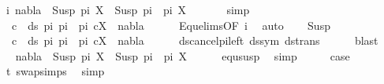 \begin{isabellebody}
\ i{\isacharcolon}{\kern0pt}\ {\isachardoublequoteopen}nabla\ {\isasymturnstile}\ Susp\ pi\ X\ {\isasymapprox}\ Susp\ {\isacharparenleft}{\kern0pt}pi{}\ {\isacharat}{\kern0pt}\ pi{\isacharprime}{\kern0pt}{\isacharparenright}{\kern0pt}\ X{\isachardoublequoteclose}\ \isanewline
\ \ \ \ \isamarkupfalse%
\ simp\isanewline
\ \ \isamarkupfalse%
\ \isamarkupfalse%
\ {\isachardoublequoteopen}{\isasymforall}\ c\ {\isasymin}\ ds\ pi\ {\isacharparenleft}{\kern0pt}pi{}\ {\isacharat}{\kern0pt}\ pi{\isacharprime}{\kern0pt}{\isacharparenright}{\kern0pt}{\isachardot}{\kern0pt}\ {\isacharparenleft}{\kern0pt}c{\isacharcomma}{\kern0pt}X{\isacharparenright}{\kern0pt}\ {\isasymin}\ nabla{\isachardoublequoteclose}\isanewline
\ \ \ \ \isamarkupfalse%
\ Equ{\isacharunderscore}{\kern0pt}elims{\isacharparenleft}{\kern0pt}{}{\isacharparenright}{\kern0pt}{\isacharbrackleft}{\kern0pt}OF\ i{\isacharbrackright}{\kern0pt}\ \isamarkupfalse%
\ auto\isanewline
\ \ \isamarkupfalse%
\ Susp\ \isamarkupfalse%
\ {\isachardoublequoteopen}{\isasymforall}\ c\ {\isasymin}\ ds\ pi\ {\isacharparenleft}{\kern0pt}pi{}\ {\isacharat}{\kern0pt}\ pi{\isacharprime}{\kern0pt}{\isacharparenright}{\kern0pt}{\isachardot}{\kern0pt}\ {\isacharparenleft}{\kern0pt}c{\isacharcomma}{\kern0pt}X{\isacharparenright}{\kern0pt}\ {\isasymin}\ nabla{\isachardoublequoteclose}\isanewline
\ \ \ \ \isamarkupfalse%
\ ds{\isacharunderscore}{\kern0pt}cancel{\isacharunderscore}{\kern0pt}pi{\isacharunderscore}{\kern0pt}left\ ds{\isacharunderscore}{\kern0pt}sym\ ds{\isacharunderscore}{\kern0pt}trans\isanewline
\ \ \ \ \isamarkupfalse%
\ blast\isanewline
\ \ \isamarkupfalse%
\ \isamarkupfalse%
\ {\isachardoublequoteopen}nabla\ {\isasymturnstile}\ Susp\ pi\ X\ {\isasymapprox}\ Susp\ {\isacharparenleft}{\kern0pt}pi{}\ {\isacharat}{\kern0pt}\ pi{\isacharprime}{\kern0pt}{\isacharparenright}{\kern0pt}\ X{\isachardoublequoteclose}\isanewline
\ \ \ \ \isamarkupfalse%
\ equ{\isacharunderscore}{\kern0pt}susp\ \isamarkupfalse%
\ simp\isanewline
\ \ \isamarkupfalse%
\ \isamarkupfalse%
\ {\isacharquery}{\kern0pt}case\ \isamarkupfalse%
\ t{}\ swap{\isachardot}{\kern0pt}simps{\isacharparenleft}{\kern0pt}{}{\isacharparenright}{\kern0pt}\ \isamarkupfalse%
\ simp\isanewline
{}\isamarkupfalse%

\end{isabellebody}

